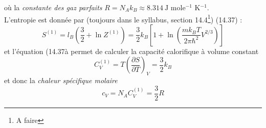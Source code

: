\documentclass	[11pt, a4paper, openany]{book}
\begin{document}
où la \textit{constante des gaz parfaits} $R = N_Ak_B \approx 8.314\ \text{J mole$^{-1}$ K$^{-1}$}$.\\
L'entropie est donnée par (toujours dans le syllabus, section 14.4\footnote{A faire}) (14.37) :
\begin{equation}
S^{(1)} = l_B(\frac{3}{2}+\ln Z^{(1)}) = \frac{3}{2}k_B\left[1+\ln\left(\dfrac{mk_BT}{2\pi\hbar^2}V^{
2/3}\right)\right]
\end{equation}
et l'équation (14.37à permet de calculer la capacité calorifique à volume constant 
\begin{equation}
C_V^{(1)} = T\left(\frac{\partial S}{\partial T}\right)_V = \frac{3}{2}k_B
\end{equation}
et donc la \textit{chaleur spécifique molaire}
\begin{equation}
c_V = N_AC_V^ {(1)} = \frac{3}{2}R
\end{equation}
\end{document}
